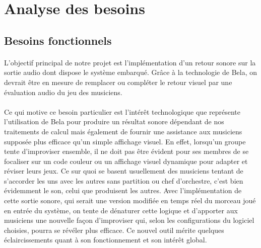 \section{Analyse des besoins}

\subsection{Besoins fonctionnels}
\paragraph{}
L'objectif principal de notre projet est l'implémentation d'un retour
sonore sur la sortie audio dont dispose le système embarqué. Grâce à
la technologie de Bela, on devrait être en mesure de remplacer ou
compléter le retour visuel par une évaluation audio du jeu des
musiciens.
\paragraph{}
Ce qui motive ce besoin particulier est l'intérêt technologique que
représente l'utilisation de Bela pour produire un résultat sonore
dépendant de nos traitements de calcul mais également de fournir une
assistance aux musiciens supposée plus efficace qu'un simple affichage
visuel. En effet, lorsqu'un groupe tente d'improviser ensemble, il ne
doit pas être évident pour ses membres de se focaliser sur un code
couleur ou un affichage visuel dynamique pour adapter et réviser leurs
jeux. Ce sur quoi se basent usuellement des musiciens tentant de
s'accorder les uns avec les autres sans partition ou chef d'orchestre,
c'est bien évidemment le son, celui que produisent les autres. Avec
l'implémentation de cette sortie sonore, qui serait une version
modifiée en temps réel du morceau joué en entrée du système, on tente
de dénaturer cette logique et d'apporter aux musiciens une nouvelle
façon d'improviser qui, selon les configurations du logiciel choisies,
pourra se révéler plus efficace. Ce nouvel outil mérite quelques
éclaircissements quant à son fonctionnement et son intérêt global.
